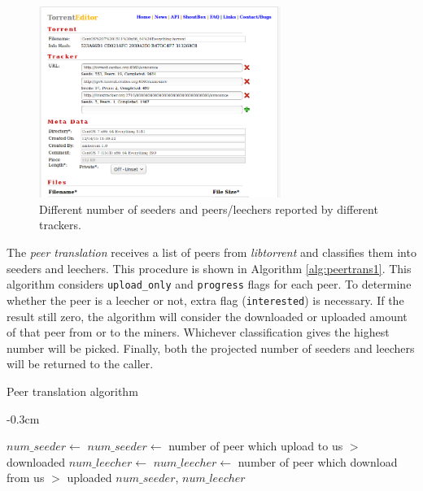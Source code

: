 \begin{figure}[ht]
	\centering
	\includegraphics[width=0.7\textwidth]{pics/diffsr.png}
	\caption{Different number of seeders and peers/leechers reported by different trackers.}
	\label{fig:diffsr}
\end{figure}

The \textit{peer translation} receives a list of peers from \textit{libtorrent} and classifies them into seeders and leechers. This procedure is shown in Algorithm \ref{alg:peertrans1}. This algorithm considers \texttt{upload\_only} and \texttt{progress} flags for each peer. To determine whether the peer is a leecher or not, extra flag (\texttt{interested}) is necessary. If the result still zero, the algorithm will consider the downloaded or uploaded amount of that peer from or to the miners. Whichever classification gives the highest number will be picked. Finally, both the projected number of seeders and leechers will be returned to the caller.

\begin{algorithm}[t]
	\caption{Peer translation algorithm}
	\label{alg:peertrans1}
	\begin{adjustwidth}{}{-0.3cm}
	\begin{algorithmic}[1]
		\Statex
		\State $num\_seeder \gets $ 
		\State $num\_seeder \gets $ number of peer which upload to us $>$ downloaded
		\EndIf
		\State $num\_leecher \gets $  \label{alg:peertrans1:pickleech}
		\State $num\_leecher \gets $ number of peer which download from us $>$ uploaded
		\EndIf
		\State \Return $num\_seeder$, $num\_leecher$
		\EndFunction
	\end{algorithmic}
	\end{adjustwidth}
\end{algorithm}


